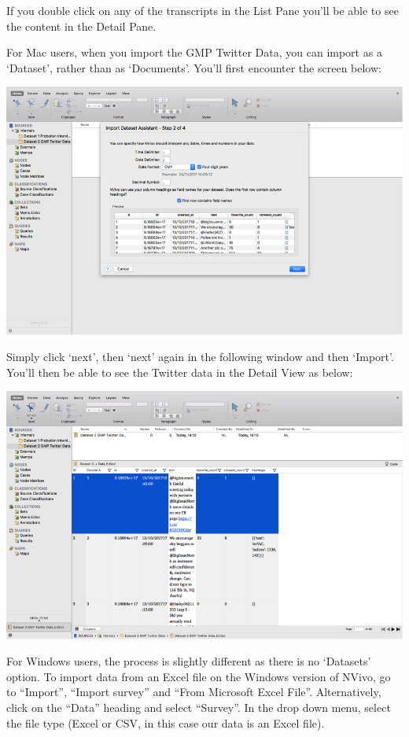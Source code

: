 \documentclass[]{book}
\theoremstyle{definition}
\theoremstyle{definition}
\theoremstyle{definition}
\theoremstyle{remark}
\begin{document}
If you double click on any of the transcripts in the List Pane you'll be
able to see the content in the Detail Pane.

For Mac users, when you import the GMP Twitter Data, you can import as a
`Dataset', rather than as `Documents'. You'll first encounter the screen
below:

\includegraphics{imgs/qual_33.png}

Simply click `next', then `next' again in the following window and then
`Import'. You'll then be able to see the Twitter data in the Detail View
as below:

\includegraphics{imgs/qual_34.png}

For Windows users, the process is slightly different as there is no
`Datasets' option. To import data from an Excel file on the Windows
version of NVivo, go to ``Import'', ``Import survey'' and ``From
Microsoft Excel File''. Alternatively, click on the ``Data'' heading and
select ``Survey''. In the drop down menu, select the file type (Excel or
CSV, in this case our data is an Excel file).
\end{document}
